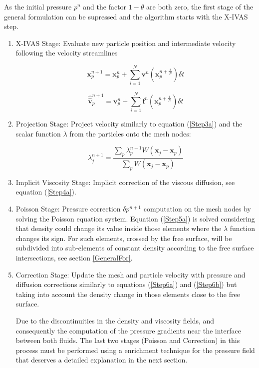 As the initial pressure $p^n$ and the factor $1-\theta$ are both zero, the first stage of the general formulation can be supressed and the algorithm starts with the X-IVAS step.

\begin{enumerate}

\item X-IVAS Stage: Evaluate new particle position and intermediate velocity following the velocity streamlines

 \begin{equation}\label{Step2astep2fluids}
\mathbf{x}^{n+1}_{p}=\mathbf{x}^{n}_{p} + \sum_{i=1}^{N} \mathbf{v}^{n}(\mathbf{x}^{n+\frac{i}{N}}_{p}) \delta t
\end{equation}

\begin{equation}\label{Step2bstep2fluids}
\widehat{\widehat{\mathbf{v}}}^{n+1}_{p}=\mathbf{v}^{n}_{p} + \sum_{i=1}^{N} \mathbf{f}^{n} (\mathbf{x}^{n+\frac{i}{N}}_{p})  \delta t
\end{equation}

\item Projection Stage: Project velocity similarly to equation (\ref{Step3a}) and the scalar function $\lambda$ from the particles onto the mesh nodes:

\begin{equation}\label{Step3b}
\displaystyle \lambda^{n+1}_{j}=\frac{\sum_{p} \lambda^{n+1}_{p} W(\mathbf{x}_{j}-\mathbf{x}_{p})}{\sum_{p} W(\mathbf{x}_{j}-\mathbf{x}_{p})}
\end{equation}

\item Implicit Viscosity Stage: Implicit correction of the viscous diffusion, see equation (\ref{Step4a}).

\item Poisson Stage: Pressure correction $\delta p^{n+1}$ computation on the mesh nodes by solving the Poisson equation system. Equation (\ref{Step5a}) is solved considering that density could change its value inside those elements where the $\lambda$ function changes its sign. For such elements, crossed by the free surface, will be subdivided into sub-elements of constant density according to the free surface intersections, see section \ref{GeneralFor}.

\item Correction Stage: Update the mesh and particle velocity with pressure and diffusion corrections similarly to equations (\ref{Step6a}) and (\ref{Step6b}) but taking into account the density change in those elements close to the free surface.
    
    Due to the discontinuities in the density and viscosity fields, and consequently the computation of the pressure gradients near the interface between both fluids. The last two stages (Poisson and Correction) in this process must be performed using a enrichment technique for the pressure field that deserves a detailed explanation in the next section. 

\end{enumerate}
